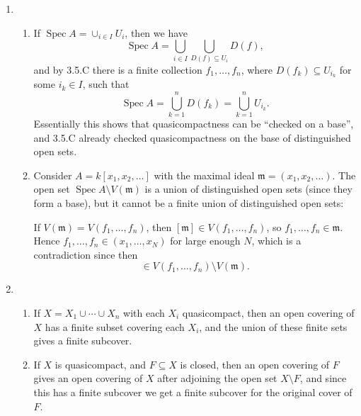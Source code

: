 \documentclass{report}
\newcommand{\m}{\mathfrak{m}}
\DeclareMathOperator{\Spec}{Spec}
\begin{document}
\begin{enumerate}[label=\textbf{3.6.\Alph*.}]
	\item
	      \begin{enumerate}[label=(\alph*)]
		      \item If $\Spec A=\cup_{i\in I}U_i$, then we have
		            \begin{equation*}
			            \Spec A = \bigcup_{i\in I}\bigcup_{D(f)\subseteq U_i}D(f),
		            \end{equation*}
		            and by 3.5.C there is a finite collection $f_1,\ldots,f_n$,
		            where $D(f_k)\subseteq U_{i_k}$ for some $i_k\in I$, such that
		            \begin{equation*}
			            \Spec A = \bigcup_{k=1}^nD(f_k) = \bigcup_{k=1}^nU_{i_k}.
		            \end{equation*}
		            Essentially this shows that quasicompactness can be ``checked on
		            a base'', and 3.5.C already checked quasicompactness on the base
		            of distinguished open sets.

		      \item Consider $A=k[x_1,x_2,\ldots]$ with the maximal ideal
		            $\m=(x_1,x_2,\ldots)$. The open set $\Spec A\setminus V(\m)$ is
		            a union of distinguished open sets (since they form a base), but
		            it cannot be a finite union of distinguished open sets:

		            If $V(\m)=V(f_1,\ldots,f_n)$, then $[\m]\in V(f_1,\ldots,f_n)$,
		            so $f_1,\ldots,f_n\in\m$. Hence
		            $f_1,\ldots,f_n\in(x_1,\ldots,x_N)$ for large enough $N$, which
		            is a contradiction since then
		            \begin{equation*}
			            [(x_1,\ldots,x_N)]\in V(f_1,\ldots,f_n)\setminus V(\m).
		            \end{equation*}
	      \end{enumerate}

	\item
	      \begin{enumerate}[label=(\alph*)]
		      \item If $X=X_1\cup\cdots\cup X_n$ with each $X_i$ quasicompact,
		            then an open covering of $X$ has a finite subset covering each
		            $X_i$, and the union of these finite sets gives a finite
		            subcover.

		      \item If $X$ is quasicompact, and $F\subseteq X$ is closed, then an
		            open covering of $F$ gives an open covering of $X$ after
		            adjoining the open set $X\setminus F$, and since this has a
		            finite subcover we get a finite subcover for the original cover
		            of $F$.
	      \end{enumerate}


\end{enumerate}
\end{document}
